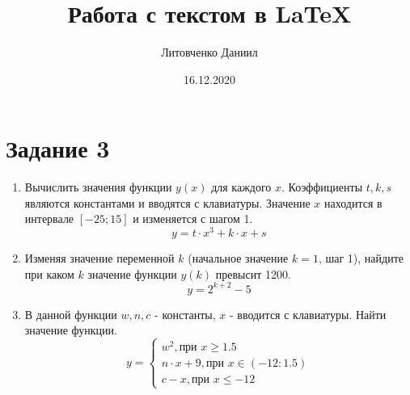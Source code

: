 \documentclass[a4paper,12pt]{article} %
\author{Литовченко Даниил}
\title{Работа с текстом в \LaTeX{}}
\date{16.12.2020}
\begin{document}

\maketitle
\newpage
\section{Задание 3}
\begin{enumerate}
\item Вычислить значения функции $y(x)$ для каждого $x$. Коэффициенты $t, k, s$ являются константами и вводятся с клавиатуры. Значение $x$ находится в интервале $[-25;15]$ и изменяется с шагом 1.
$$y=t\cdot x^3+k\cdot x+s$$
\item Изменяя значение переменной $k$ (начальное значение $k=1$, шаг 1), найдите при каком $k$ значение функции $y(k)$ превысит 1200.
$$y=2^{k+2}-5$$
\item В данной функции $w,n,c$ - константы, $x$ - вводится с клавиатуры. Найти значение функции.
\begin{equation*}
	y=
	\begin{cases}
		w^2,\text{при } x\geq1.5\\
		n\cdot x+9, \text{при } x\in (-12:1.5)\\
		c - x, \text{при } x\leq -12
	\end{cases}
\end{equation*}
\end{enumerate}
\end{document}
